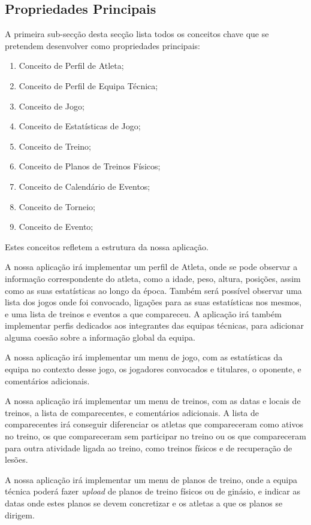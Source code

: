 \subsection{Propriedades Principais} \label{sec221}
A primeira sub-secção desta secção lista todos os conceitos chave que se pretendem desenvolver como propriedades principais:
\begin{enumerate}
	\item Conceito de Perfil de Atleta;
	\item Conceito de Perfil de Equipa Técnica;
	\item Conceito de Jogo;
	\item Conceito de Estatísticas de Jogo;
	\item Conceito de Treino;
	\item Conceito de Planos de Treinos Físicos;
	\item Conceito de Calendário de Eventos;
	\item Conceito de Torneio;
	\item Conceito de Evento;
\end{enumerate}

Estes conceitos refletem a estrutura da nossa aplicação. 

A nossa aplicação irá implementar um perfil de Atleta, onde se pode observar a informação correspondente do atleta, como a idade, peso, altura, posições, assim como as suas estatísticas ao longo da época. Também será possível observar uma lista dos jogos onde foi convocado, ligações para as suas estatísticas nos mesmos, e uma lista de treinos e eventos a que compareceu. A aplicação irá também implementar perfis dedicados aos integrantes das equipas técnicas, para adicionar alguma coesão sobre a informação global da equipa.

A nossa aplicação irá implementar um menu de jogo, com as estatísticas da equipa no contexto desse jogo, os jogadores convocados e titulares, o oponente, e comentários adicionais.

A nossa aplicação irá implementar um menu de treinos, com as datas e locais de treinos, a lista de comparecentes, e comentários adicionais. A lista de comparecentes irá conseguir diferenciar os atletas que compareceram como ativos no treino, os que compareceram sem participar no treino ou os que compareceram para outra atividade ligada ao treino, como treinos físicos e de recuperação de lesões.

A nossa aplicação irá implementar um menu de planos de treino, onde a equipa técnica poderá fazer \emph{upload} de planos de treino físicos ou de ginásio, e indicar as datas onde estes planos se devem concretizar e os atletas a que os planos se dirigem.

